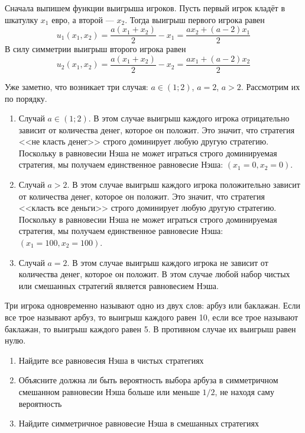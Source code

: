 \begin{solution}
Сначала выпишем функции выигрыша игроков. Пусть первый игрок кладёт в шкатулку $x_1$ евро, а второй --- $x_2$. Тогда выигрыш первого игрока равен
\[
u_1(x_1,x_2)=\frac{a(x_1+x_2)}{2} - x_1=\frac{ax_2+(a-2)x_1}{2}
\]
В силу симметрии выигрыш второго игрока равен
\[
u_2(x_1,x_2)=\frac{a(x_1+x_2)}{2} - x_2=\frac{ax_1+(a-2)x_2}{2}
\]

Уже заметно, что возникает три случая: $a \in (1;2)$, $a=2$, $a>2$. Рассмотрим их по порядку.
\begin{enumerate}
\item Случай $a\in(1;2)$. В этом случае выигрыш каждого игрока отрицательно зависит от количества денег, которое он положит. Это значит, что стратегия <<не класть денег>> строго доминирует любую другую стратегию. Поскольку в равновесии Нэша не может играться строго доминируемая стратегия, мы получаем единственное равновесие Нэша: $(x_1=0, x_2=0)$.

\item Случай $a>2$. В этом случае выигрыш каждого игрока положительно зависит от количества денег, которое он положит. Это значит, что стратегия <<класть все деньги>> строго доминирует любую другую стратегию. Поскольку в равновесии Нэша не может играться строго доминируемая стратегия, мы получаем единственное равновесие Нэша: $(x_1=100, x_2=100)$.

\item Случай $a=2$. В этом случае выигрыш каждого игрока не зависит от количества денег, которое он положит. В этом случае любой набор чистых или смешанных стратегий является равновесием Нэша.

\end{enumerate}
\end{solution}

\begin{problem}
Три игрока одновременно называют одно из двух слов: арбуз или баклажан. Если все трое называют арбуз, то выигрыш каждого равен 10, если все трое называют баклажан, то  выигрыш каждого равен 5. В противном случае их выигрыш равен нулю.
\begin{enumerate}
\item Найдите все равновесия Нэша в чистых стратегиях
\item Объясните должна ли быть вероятность выбора арбуза в симметричном смешанном равновесии Нэша больше или меньше $1/2$, не находя саму вероятность
\item Найдите симметричное равновесие  Нэша в смешанных стратегиях
\end{enumerate}
\end{problem}

